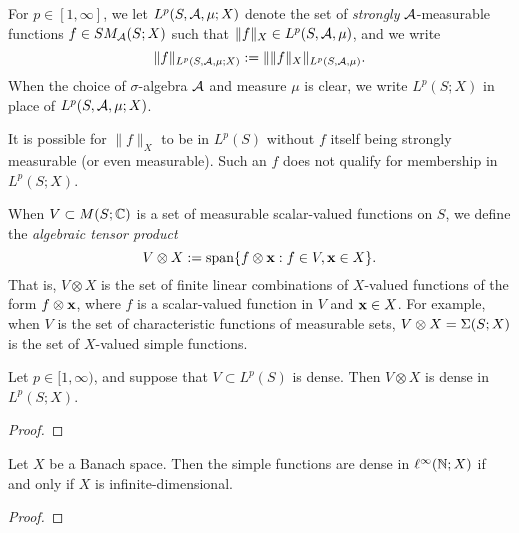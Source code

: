 \begin{defn}
  For $p \in [1,\infty]$, we let $L^p(S,\mathcal{A},\mu;X)$ denote the set of \emph{strongly} $\mathcal{A}$-measurable functions $f \in SM_{\mathcal{A}}(S;X)$ such that $\|f\|_X \in L^p(S,\mathcal{A},\mu)$, and we write
  \begin{equation*}
    \|f\|_{L^p(S,\mathcal{A},\mu;X)} := \| \|f\|_X \|_{L^p(S,\mathcal{A},\mu)}.
  \end{equation*}
  When the choice of $\sigma$-algebra $\mathcal{A}$ and measure $\mu$ is clear, we write $L^p(S;X)$ in place of $L^p(S,\mathcal{A},\mu;X)$.
\end{defn}

\begin{rmk}
  It is possible for $\|f\|_X$ to be in $L^p(S)$ without $f$ itself being strongly measurable (or even measurable).
  Such an $f$ does not qualify for membership in $L^p(S;X)$.
\end{rmk}

When $V \subset M(S;\mathbb{C})$ is a set of measurable scalar-valued functions on $S$, we define the \emph{algebraic tensor product}
\begin{equation*}
  V \otimes X := \mathrm{span}\{f \otimes \mathbf{x} : f \in V, \mathbf{x} \in X\}.
\end{equation*}
That is, $V \otimes X$ is the set of finite linear combinations of $X$-valued functions of the form $f \otimes \mathbf{x}$, where $f$ is a scalar-valued function in $V$ and $\mathbf{x} \in X$.
For example, when $V$ is the set of characteristic functions of measurable sets, $V \otimes X = \Sigma(S;X)$ is the set of $X$-valued simple functions.

\begin{prop}
  Let $p \in [1,\infty)$, and suppose that $V \subset L^p(S)$ is dense.
  Then $V \otimes X$ is dense in $L^p(S;X)$.
\end{prop}

\begin{proof}
  
\end{proof}

\begin{prop}
  Let $X$ be a Banach space.
  Then the simple functions are dense in $\ell^\infty(\mathbb{N};X)$ if and only if $X$ is infinite-dimensional.
\end{prop}

\begin{proof}
  
\end{proof}

